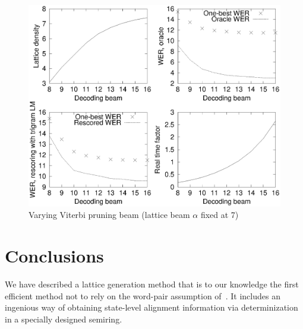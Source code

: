 \documentclass{article}
\begin{document}
\begin{figure}
\centering
   \includegraphics[width=0.9\columnwidth]{figures/decodebeam.eps} 
 \vspace*{-0.1in}
    \caption{\vspace*{-0.2in} Varying Viterbi pruning beam (lattice beam $\alpha$ fixed at 7) }
  \label{fig:viterbibeam}
\end{figure}


\section{Conclusions}
\label{sec:conc}

We have described a lattice generation method that is to our knowledge the first
efficient method not to rely on the word-pair assumption of~\cite{ney_word_graph}.
It includes an ingenious way of obtaining state-level alignment information
via determinization in a specially designed semiring. 




\end{document}
